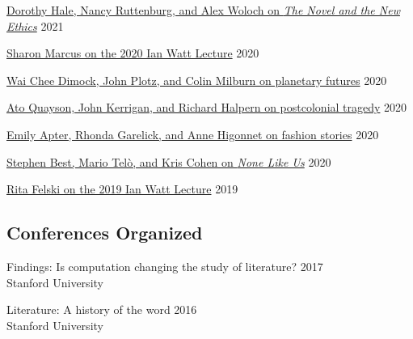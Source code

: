 \documentclass[
  12pt,
  letterpaper,
]{article}
\begin{document}
\href{https://web.archive.org/web/20220429093353/https://novel.stanford.edu/csn-cafe/2021/7/23/books-at-the-center-dorothy-hale-the-novel-and-the-new-ethics-11521}{Dorothy
Hale, Nancy Ruttenburg, and Alex Woloch on \emph{The Novel and the New
Ethics}} \hfill 2021

\href{https://web.archive.org/web/20220429093326/https://novel.stanford.edu/csn-cafe/2021/7/23/sharon-marcus-on-her-ian-watt-lecture-103020}{Sharon
Marcus on the 2020 Ian Watt Lecture} \hfill 2020

\href{https://web.archive.org/web/20220429010109/https://novel.stanford.edu/csn-cafe/2021/7/23/wai-chee-dimock-john-plotz-and-colin-milburn-on-the-literature-of-planetary-futures-52319}{Wai
Chee Dimock, John Plotz, and Colin Milburn on planetary futures}
\hfill 2020

\href{https://web.archive.org/web/20220429010041/https://novel.stanford.edu/csn-cafe/2021/7/23/ato-quayson-john-kerrigan-and-richard-halpern-on-postcolonial-tragedy-91519}{Ato
Quayson, John Kerrigan, and Richard Halpern on postcolonial tragedy}
\hfill 2020

\href{https://web.archive.org/web/20220429093237/https://novel.stanford.edu/csn-cafe/2021/7/23/fashion-stories-emily-apter-rhonda-garelick-and-anne-higonnet-on-the-cultural-history-of-clothing-1920}{Emily
Apter, Rhonda Garelick, and Anne Higonnet on fashion stories}
\hfill 2020

\href{https://web.archive.org/web/20220429093211/https://novel.stanford.edu/csn-cafe/2021/7/23/books-at-the-center-stephen-best-mario-tel-and-kris-cohen-on-none-like-us-101019}{Stephen
Best, Mario Telò, and Kris Cohen on \emph{None Like Us}} \hfill 2020

\href{https://web.archive.org/web/20220429093144/https://novel.stanford.edu/csn-cafe/2021/7/23/rita-felski-on-her-2019-ian-watt-lecture-5319}{Rita
Felski on the 2019 Ian Watt Lecture} \hfill 2019

\hypertarget{conferences-organized}{%
\subsection{Conferences Organized}\label{conferences-organized}}

Findings: Is computation changing the study of literature? \hfill 2017\\
\hspace*{0.333em} Stanford University

Literature: A history of the word \hfill 2016\\
\hspace*{0.333em} Stanford University
\end{document}
